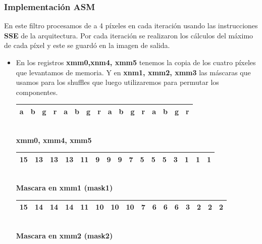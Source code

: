\subsubsection{Implementación ASM}

En este filtro procesamos de a 4 píxeles en cada iteración usando las instrucciones \textbf{SSE} de la arquitectura. Por cada iteración se realizaron los cálculos del máximo de cada píxel y este se guardó en la imagen de salida.

\begin{itemize}

	\item En los registros \textbf{xmm0,xnm4, xmm5} tenemos la copia de los cuatro píxeles que levantamos de memoria. Y en \textbf{xnm1, xmm2, xmm3} las máscaras que usamos para los shuffles que luego utilizaremos para permutar los componentes.

		\begin{center}
		   \begin{tabular}{| c | c | c | c || c | c | c | c || c | c | c | c || c | c | c | c |}
			 \hline
			 a & b & g & r & a & b & g & r & a & b & g & r & a & b & g & r \\ \hline

		   \end{tabular}
		   \\ \textbf{xmm0, xmm4, xmm5}
		\end{center}
		 
		\begin{center}
		   \begin{tabular}{| c | c | c | c || c | c | c | c || c | c | c | c || c | c | c | c |}
			 \hline
			 15 & 13 & 13 & 13 & 11 & 9 & 9 & 9 & 7 & 5 & 5 & 5 & 3 & 1 & 1 & 1 \\ \hline
		   \end{tabular}
		   \\  \textbf{Mascara en xmm1 (mask1)}
		\end{center}

		\begin{center}
		   \begin{tabular}{| c | c | c | c || c | c | c | c || c | c | c | c || c | c | c | c |}
			 \hline
			 15 & 14 & 14 & 14 & 11 & 10 & 10 & 10 & 7 & 6 & 6 & 6 & 3 & 2 & 2 & 2 \\ \hline
		   \end{tabular}
		   \\ \textbf{Mascara en xmm2 (mask2)}
		\end{center}


\end{itemize}

